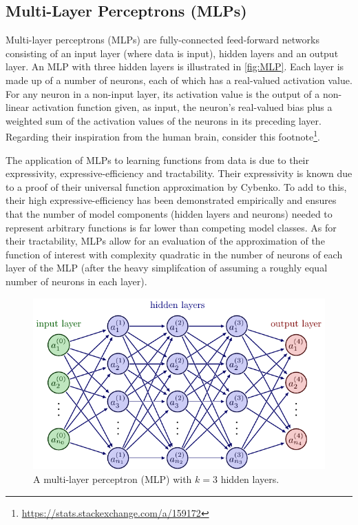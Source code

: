 \documentclass[11pt]{article}
\begin{document}
\subsection{Multi-Layer Perceptrons (MLPs)}
\label{sec:multi_layer_perceptrons}

Multi-layer perceptrons (MLPs) are fully-connected feed-forward networks consisting of an input layer (where data is input), hidden layers and an output layer. An MLP with three hidden layers is illustrated in \autoref{fig:MLP}. Each layer is made up of a number of neurons, each of which has a real-valued activation value.  For any neuron in a non-input layer, its activation value is the output of a non-linear activation function given, as input, the neuron's real-valued bias plus a weighted sum of the activation values of the neurons in its preceding layer. Regarding their inspiration from the human brain, consider this footnote\footnote{\url{https://stats.stackexchange.com/a/159172}}.

The application of MLPs to learning functions from data is due to their expressivity, expressive-efficiency and tractability. Their expressivity is known due to a proof of their universal function approximation by Cybenko. To add to this, their high expressive-efficiency has been demonstrated empirically and ensures that the number of model components (hidden layers and neurons) needed to represent arbitrary functions is far lower than competing model classes. As for their tractability, MLPs allow for an evaluation of the approximation of the function of interest with complexity quadratic in the number of neurons of each layer of the MLP (after the heavy simplifcation of assuming a roughly equal number of neurons in each layer).

\begin{figure}[t]
    \centering
    \includegraphics[width=\linewidth]{./figures/neural_nets/MLP_1.pdf}
    \caption{A multi-layer perceptron (MLP) with $k=3$ hidden layers.}
    \label{fig:MLP}
\end{figure}
\end{document}
